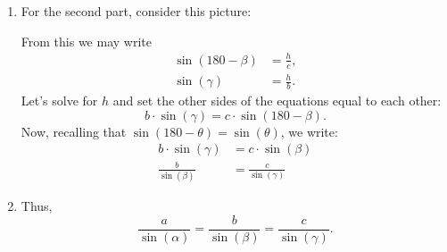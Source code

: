 \documentclass[noauthor,nooutcomes,12pt,handout,hints]{ximera}
\begin{document}
\begin{question}
\begin{freeResponse}
\begin{enumerate}
    \item For the second part, consider this picture:
    \begin{center}
    \end{center}
    From this we may write
    \begin{align*}
      \sin(180-\beta) &= \frac{h}{c},\\
      \sin(\gamma) &= \frac{h}{b}.
    \end{align*}
    Let's solve for $h$ and set the other sides of the equations equal
    to each other:
    \[
    b\cdot\sin(\gamma) = c\cdot \sin(180-\beta).
    \]
    Now, recalling that $\sin(180-\theta) = \sin(\theta)$, we write:
    \begin{align*}
      b\cdot\sin(\gamma) &= c\cdot \sin(\beta)\\
      \frac{b}{\sin(\beta)} &= \frac{c}{\sin(\gamma)}
    \end{align*}
    \item Thus,
    \[
    \frac{a}{\sin(\alpha)} = \frac{b}{\sin(\beta)} = \frac{c}{\sin(\gamma)}.
    \]  
    \end{enumerate}
  \end{freeResponse}
\end{question}
\mynewpage
\end{document}
